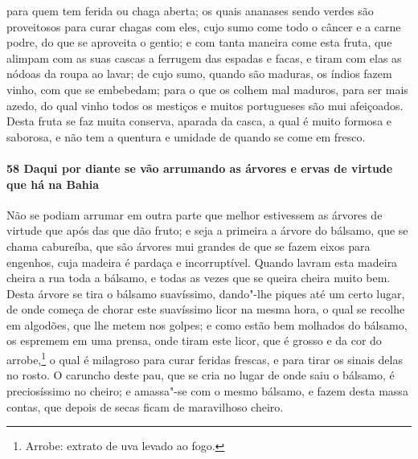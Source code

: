 \begin{linenumbers}
para quem tem ferida ou chaga aberta; os quais ananases sendo verdes são proveitosos para
curar chagas com eles, cujo sumo come todo o câncer e a carne podre, do que se aproveita o
gentio; e com tanta maneira come esta fruta, que alimpam com as suas cascas a ferrugem das
espadas e facas, e tiram com elas as nódoas da roupa ao lavar; de cujo sumo, quando são
maduras, os índios fazem vinho, com que se embebedam; para o que os colhem mal maduros,
para ser mais azedo, do qual vinho todos os mestiços e muitos portugueses são mui
afeiçoados. Desta fruta se faz muita conserva, aparada da casca, a qual é muito formosa e
saborosa, e não tem a quentura e umidade de quando se come em fresco.

\paragraph{58 Daqui por diante se vão arrumando as árvores e ervas de virtude que há na
Bahia}\quad
Não se podiam arrumar em outra parte que melhor estivessem as árvores de virtude que após
das que dão fruto; e seja a primeira a árvore do bálsamo, que se chama cabureíba, que são
árvores mui grandes de que se fazem eixos para engenhos, cuja madeira é pardaça e
incorruptível. Quando lavram esta madeira cheira a rua toda a bálsamo, e todas as vezes
que se queira cheira muito bem. Desta árvore se tira o bálsamo suavíssimo, dando"-lhe
piques até um certo lugar, de onde começa de chorar este suavíssimo licor na mesma hora, o
qual se recolhe em algodões, que lhe metem nos golpes; e como estão bem molhados do
bálsamo, os espremem em uma prensa, onde tiram este licor, que é grosso e da cor do
arrobe,\footnote{ Arrobe: extrato de uva levado ao fogo.} o qual é milagroso para curar
feridas frescas, e para tirar os sinais delas no rosto. O caruncho deste pau, que se cria
no lugar de onde saiu o bálsamo, é preciosíssimo no cheiro; e amassa"-se com o mesmo
bálsamo, e fazem desta massa contas, que depois de secas ficam de maravilhoso cheiro.


\end{linenumbers}
